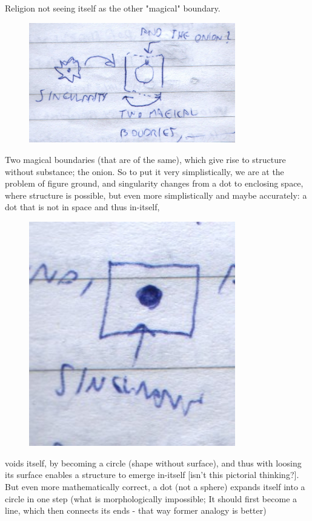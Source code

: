 \documentclass{book}
\begin{document}
Religion not seeing itself as the other "magical" boundary. 
\begin{figure}[ht!]
\centering
\includegraphics[width=90mm]{scan03.jpg}
\label{overflow}
\end{figure}
Two magical boundaries (that are of the same), which give rise to structure without substance; the onion.
So to put it very simplistically, we are at the problem of figure ground, and singularity changes from a dot to enclosing space, where structure is possible, but even more simplistically and maybe accurately: a dot that is not in space and thus in-itself, 
\begin{figure}[ht!]
\centering
\includegraphics[width=90mm]{scan04.jpg}
\label{overflow}
\end{figure}
voids itself, by becoming a circle (shape without surface), and thus with loosing its surface enables a structure to emerge in-itself [isn't this pictorial thinking?]. But even more mathematically correct, a dot (not a sphere) expands itself into a circle in one step (what is morphologically impossible; It should first become a line, which then connects its ends - that way former analogy is better)
\end{document}

